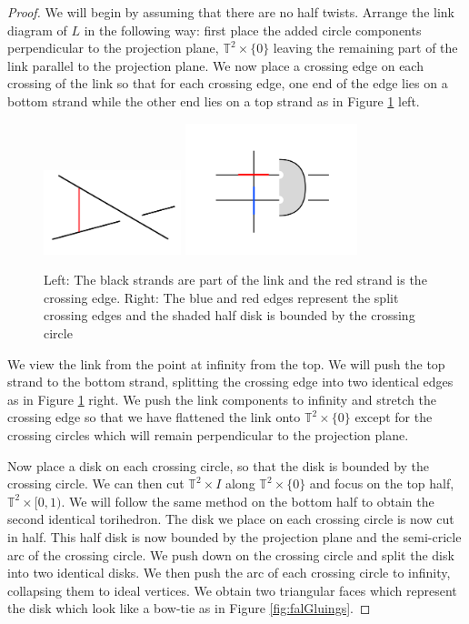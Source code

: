 \documentclass[11pt]{amsart}
\newcommand{\torus}{{\mathbb{T}^2}}
\theoremstyle{plain}
\theoremstyle{definition}
\begin{document}
\begin{proof}
We will begin by assuming that there are no half twists. 
Arrange the link diagram of $L$ in the following way: first place the added
circle components perpendicular to the projection plane, $\torus
\times \{0\}$ leaving the remaining part of the link parallel to the projection
plane.  We now place a crossing edge on each crossing of the link so that for
each crossing edge, one end of the edge lies on a bottom strand while the other
end lies on a top strand as in Figure \ref{fig:crossingArc} left.

\begin{figure} 
\centering 
\includegraphics[width=4cm]{crossingArc.png}
\includegraphics[width=5cm]{crossingPush.png}
\caption{Left: The black strands are
part of the link and the red strand is the crossing edge. Right: The blue and
red edges represent the split crossing edges and the shaded half disk is bounded
by the crossing circle} 
\label{fig:crossingArc} 
\end{figure}

\indent We view the link from the point at infinity from the top. We will push
the top strand to the bottom strand, splitting the crossing edge into two
identical edges as in Figure \ref{fig:crossingArc} right. We push the link
components to infinity and stretch the crossing edge so that we have flattened
the link onto $\torus \times \{0\}$ except for the crossing circles which will
remain perpendicular to the projection plane. 
 
\indent Now place a disk on each crossing circle, so that the disk is bounded by
the crossing circle. We can then cut $\torus \times I$ along $\torus \times \{0\}$ and
focus on the top half, $\torus \times [0,1)$. We will follow the same method on the
bottom half to obtain the second identical torihedron. The disk we place on each
crossing circle is now cut in half. This half disk is now bounded by the
projection plane and the semi-cricle arc of the crossing circle. We push down on
the crossing circle and split the disk into two identical disks. We then push
the arc of each crossing circle to infinity, collapsing them to ideal vertices.
We obtain two triangular faces which represent the disk which look like a
bow-tie as in Figure \ref{fig:falGluings}. 


\end{proof}
\end{document}
